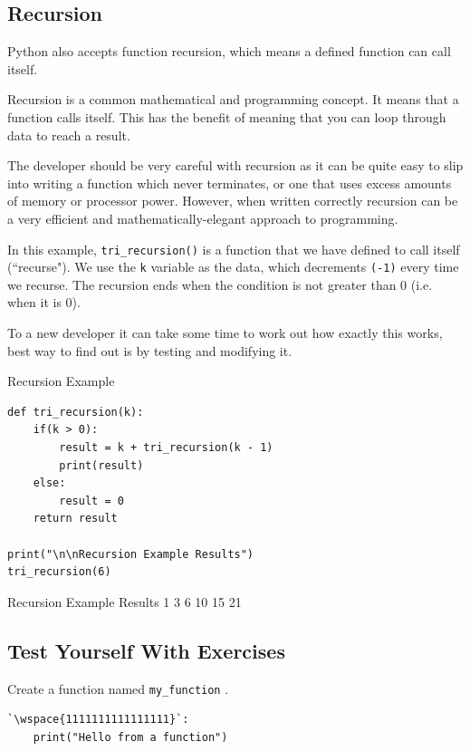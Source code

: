 \documentclass[12pt,a4paper]{article}
\newcommand{\wspace}[1]{%
	\color{white}\colorbox{white}{\texttt{#1}}%
}
\newcommand{\code}[1]{%
	\colorbox{backcolour}{\lstinline{#1}}%
}
\newcommand{\lcode}[1]{%
	\lstinline{#1}%
}
\begin{document}
\subsection{Recursion}

Python also accepts function recursion, which means a defined function can call
itself.

Recursion is a common mathematical and programming concept. It means that a
function calls itself. This has the benefit of meaning that you can loop
through data to reach a result.

The developer should be very careful with recursion as it can be quite easy to
slip into writing a function which never terminates, or one that uses excess
amounts of memory or processor power. However, when written correctly recursion
can be a very efficient and mathematically-elegant approach to programming.

In this example, \code{tri_recursion()} is a function that we have defined to
call itself (``recurse"). We use the \code{k} variable as the data, which
decrements \code{(-1)} every time we recurse. The recursion ends when the
condition is not greater than 0 (i.e. when it is 0).

To a new developer it can take some time to work out how exactly this works,
best way to find out is by testing and modifying it.

\begin{ebox}
Recursion Example
	\begin{lstlisting}
def tri_recursion(k):
    if(k > 0):
        result = k + tri_recursion(k - 1)
        print(result)
    else:
        result = 0
    return result

print("\n\nRecursion Example Results")
tri_recursion(6)
	\end{lstlisting}
\tcblower
	\begin{vercode}


Recursion Example Results
1
3
6
10
15
21
	\end{vercode}
\end{ebox}
\subsection{Test Yourself With Exercises}

\begin{tbox}
Create a function named \lcode{my_function}.
\begin{lstlisting}[numbers=none]
`\wspace{1111111111111111}`:
    print("Hello from a function")
\end{lstlisting}
\end{tbox}
\vfill\newpage
\end{document}
